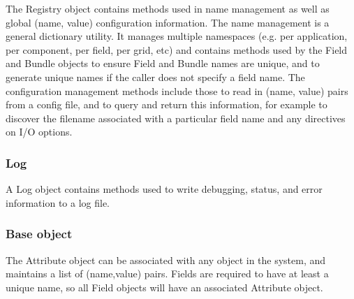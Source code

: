 The Registry object contains methods used in name management
as well as global (name, value) configuration information.
The name management is a general dictionary utility.  It
manages multiple namespaces (e.g. per application, per component,
per field, per grid, etc) and contains methods used by the
Field and Bundle objects to ensure Field and Bundle names
are unique, and to generate unique names if the caller does
not specify a field name.
The configuration management methods include those to 
read in (name, value) pairs from a config file, and to query
and return this information, for example to discover the
filename associated with a particular field name and
any directives on I/O options.


\subsubsection{Log}

A Log object contains methods used to write debugging, status,
and error information to a log file.

\subsubsection{Base object}

The Attribute object can be associated with any object in the system,
and maintains a list of (name,value) pairs.  Fields are required to
have at least a unique name, so all Field objects will have an associated
Attribute object.

